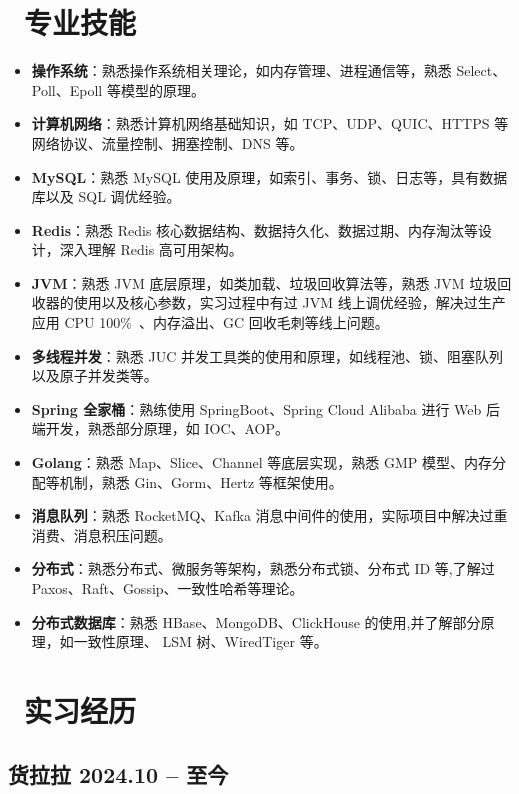 \documentclass{resume}
\renewcommand{\datedsubsection}[2]{
  \subsection*{\fontsize{10pt}{14pt}\selectfont \textbf{#1} \hfill #2}
}
\begin{document}
\section{\faCogs\ 专业技能}
\begin{itemize}[parsep=0.5ex]
  \item \textbf{操作系统}：熟悉操作系统相关理论，如内存管理、进程通信等，熟悉        Select、Poll、Epoll        等模型的原理。
  \item \textbf{计算机网络}：熟悉计算机网络基础知识，如        TCP、UDP、QUIC、HTTPS        等网络协议、流量控制、拥塞控制、DNS        等。
  \item \textbf{MySQL}：熟悉        MySQL        使用及原理，如索引、事务、锁、日志等，具有数据库以及        SQL        调优经验。
    \item \textbf{Redis}：熟悉        Redis        核心数据结构、数据持久化、数据过期、内存淘汰等设计，深入理解        Redis        高可用架构。
    \item \textbf{JVM}：熟悉        JVM        底层原理，如类加载、垃圾回收算法等，熟悉        JVM        垃圾回收器的使用以及核心参数，实习过程中有过        JVM        线上调优经验，解决过生产应用        CPU        100\%\ 、内存溢出、GC        回收毛刺等线上问题。
    \item \textbf{多线程并发}：熟悉        JUC        并发工具类的使用和原理，如线程池、锁、阻塞队列以及原子并发类等。
\item \textbf{Spring 全家桶}：熟练使用        SpringBoot、Spring        Cloud        Alibaba        进行        Web        后端开发，熟悉部分原理，如        IOC、AOP。        
\item \textbf{Golang}：熟悉        Map、Slice、Channel        等底层实现，熟悉        GMP        模型、内存分配等机制，熟悉        Gin、Gorm、Hertz        等框架使用。
\item \textbf{消息队列}：熟悉        RocketMQ、Kafka        消息中间件的使用，实际项目中解决过重消费、消息积压问题。
\item \textbf{分布式}：熟悉分布式、微服务等架构，熟悉分布式锁、分布式 ID 等,了解过        Paxos、Raft、Gossip、一致性哈希等理论。
\item \textbf{分布式数据库}：熟悉        HBase、MongoDB、ClickHouse        的使用,并了解部分原理，如一致性原理、        LSM        树、WiredTiger        等。
\end{itemize}


\section{\faUsers\ 实习经历}
\datedsubsection{\hspace{5em}\textbf{货拉拉} }{2024.10 -- 至今}
\end{document}
